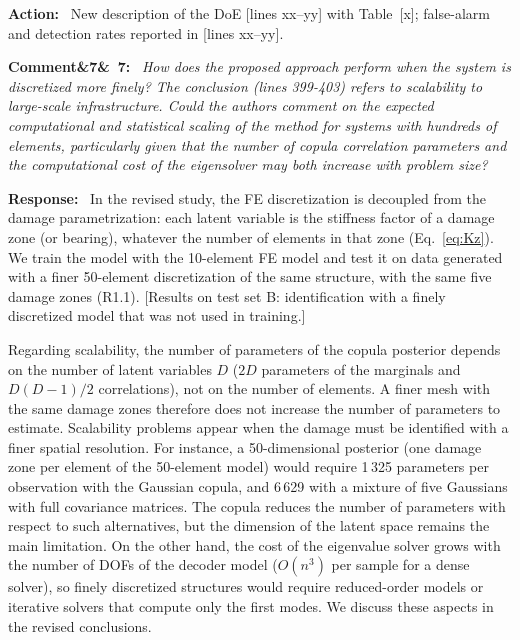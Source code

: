 \documentclass[11pt]{article}
\newenvironment{rcomment}[1]{\par\bigskip\noindent\textbf{Comment\ifx&#1&\else\ #1\fi:}\ \itshape}{\par}
\newenvironment{response}{\par\smallskip\noindent\color{resp}\textbf{Response:}\ }{\par}
\newenvironment{action}{\par\smallskip\noindent\color{resp}\textbf{Action:}\ }{\par}
\newcommand{\tbd}[1]{\textcolor{note}{\textsf{[#1]}}}
\newcommand{\lines}[1]{\tbd{lines #1}}
\begin{document}
\begin{action}
New description of the DoE \lines{xx--yy} with Table~\tbd{x}; false-alarm and detection rates reported in
\lines{xx--yy}.
\end{action}

\begin{rcomment}{7}
How does the proposed approach perform when the system is discretized more finely? The conclusion (lines 399-403)
refers to scalability to large-scale infrastructure. Could the authors comment on the expected computational and
statistical scaling of the method for systems with hundreds of elements, particularly given that the number of copula
correlation parameters and the computational cost of the eigensolver may both increase with problem size?
\end{rcomment}

\begin{response}
In the revised study, the FE discretization is decoupled from the damage parametrization: each latent variable is the
stiffness factor of a damage zone (or bearing), whatever the number of elements in that zone (Eq.~\eqref{eq:Kz}). We train
the model with the 10-element FE model and test it on data generated with a finer 50-element discretization of the same
structure, with the same five damage zones (R1.1).
\tbd{Results on test set B: identification with a finely discretized model that was not used in training.}

Regarding scalability, the number of parameters of the copula posterior depends on the number of latent variables $D$
($2D$ parameters of the marginals and $D(D-1)/2$ correlations), not on the number of elements. A finer mesh with the same
damage zones therefore does not increase the number of parameters to estimate. Scalability problems appear when the damage
must be identified with a finer spatial resolution. For instance, a 50-dimensional posterior (one damage zone per element of
the 50-element model) would require 1\,325 parameters per observation with the Gaussian copula, and 6\,629 with a mixture
of five Gaussians with full covariance matrices. The copula reduces the number of parameters with respect to such
alternatives, but the dimension of the latent space remains the main limitation. On the other hand, the cost of the
eigenvalue solver grows with the number of DOFs of the decoder model ($O(n^3)$ per sample for a dense solver), so finely
discretized structures would require reduced-order models or iterative solvers that compute only the first modes. We
discuss these aspects in the revised conclusions.
\end{response}
\end{document}

